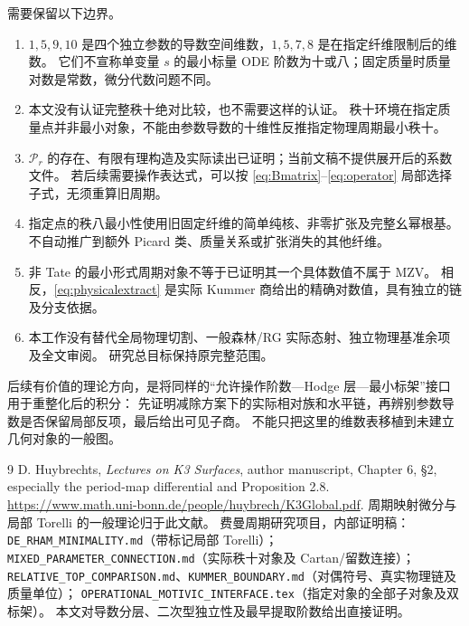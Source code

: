\documentclass[11pt,a4paper]{ctexart}
\theoremstyle{cnplain}
\theoremstyle{definition}
\theoremstyle{remark}
\begin{document}
需要保留以下边界。
\begin{enumerate}[leftmargin=2em]
\item $1,5,9,10$ 是四个独立参数的导数空间维数，$1,5,7,8$ 是在指定纤维限制后的维数。
它们不宣称单变量 $s$ 的最小标量 ODE 阶数为十或八；固定质量时质量对数是常数，微分代数问题不同。
\item 本文没有认证完整秩十绝对比较，也不需要这样的认证。
秩十环境在指定质量点并非最小对象，不能由参数导数的十维性反推指定物理周期最小秩十。
\item $\mathscr P_r$ 的存在、有限有理构造及实际读出已证明；当前文稿不提供展开后的系数文件。
若后续需要操作表达式，可以按 \eqref{eq:Bmatrix}--\eqref{eq:operator} 局部选择子式，无须重算旧周期。
\item 指定点的秩八最小性使用旧固定纤维的简单纯核、非零扩张及完整幺幂根基。
不自动推广到额外 Picard 类、质量关系或扩张消失的其他纤维。
\item 非 Tate 的最小形式周期对象不等于已证明其一个具体数值不属于 MZV。
相反，\eqref{eq:physicalextract} 是实际 Kummer 商给出的精确对数值，具有独立的链及分支依据。
\item 本工作没有替代全局物理切割、一般森林/RG 实际态射、独立物理基准余项及全文审阅。
研究总目标保持原完整范围。
\end{enumerate}

后续有价值的理论方向，是将同样的“允许操作阶数---Hodge 层---最小标架”接口用于重整化后的积分：
先证明减除方案下的实际相对族和水平链，再辨别参数导数是否保留局部反项，最后给出可见子商。
不能只把这里的维数表移植到未建立几何对象的一般图。

\begingroup\small
\begin{thebibliography}{9}
 D. Huybrechts,
\emph{Lectures on K3 Surfaces}, author manuscript,
Chapter 6, \S2, especially the period-map differential and Proposition 2.8.
\url{https://www.math.uni-bonn.de/people/huybrech/K3Global.pdf}.
周期映射微分与局部 Torelli 的一般理论归于此文献。
 费曼周期研究项目，内部证明稿：
\nolinkurl{DE_RHAM_MINIMALITY.md}（带标记局部 Torelli）；
\nolinkurl{MIXED_PARAMETER_CONNECTION.md}（实际秩十对象及 Cartan/留数连接）；
\nolinkurl{RELATIVE_TOP_COMPARISON.md}、\nolinkurl{KUMMER_BOUNDARY.md}（对偶符号、真实物理链及质量单位）；
\nolinkurl{OPERATIONAL_MOTIVIC_INTERFACE.tex}（指定对象的全部子对象及双标架）。
本文对导数分层、二次型独立性及最早提取阶数给出直接证明。
\end{thebibliography}
\endgroup
\end{document}
